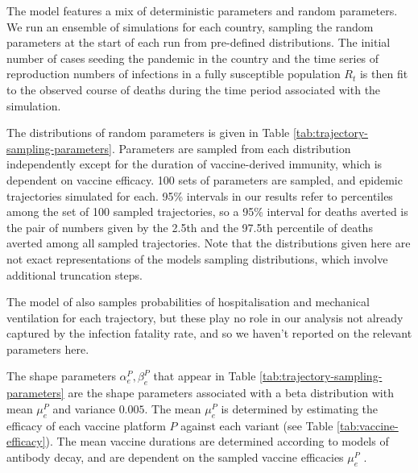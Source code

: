 \documentclass{article}
\begin{document}
The model features a mix of deterministic parameters and random parameters. We run an ensemble of simulations for each country, sampling the random parameters at the start of each run from pre-defined distributions. The initial number of cases seeding the pandemic in the country and the time series of reproduction numbers of infections in a fully susceptible population \(R_t\) is then fit to the observed course of deaths during the time period associated with the simulation.

The distributions of random parameters is given in Table \ref{tab:trajectory-sampling-parameters}. Parameters are sampled from each distribution independently except for the duration of vaccine-derived immunity, which is dependent on vaccine efficacy. 100 sets of parameters are sampled, and epidemic trajectories simulated for each. 95\% intervals in our results refer to percentiles among the set of 100 sampled trajectories, so a 95\% interval for deaths averted is the pair of numbers given by the 2.5th and the 97.5th percentile of deaths averted among all sampled trajectories. Note that the distributions given here are not exact representations of the models sampling distributions, which involve additional truncation steps.

The model of \citep{watsonoliverj.COVID19LMICReports2022} also samples probabilities of hospitalisation and mechanical ventilation for each trajectory, but these play no role in our analysis not already captured by the infection fatality rate, and so we haven't reported on the relevant parameters here.

The shape parameters \(\alpha_e^P, \beta_e^P\) that appear in Table \ref{tab:trajectory-sampling-parameters} are the shape parameters associated with a beta distribution with mean \(\mu_e^P\) and variance \(0.005\). The mean \(\mu_e^P\) is determined by estimating the efficacy of each vaccine platform \(P\) against each variant (see Table \ref{tab:vaccine-efficacy}). The mean vaccine durations are determined according to models of antibody decay, and are dependent on the sampled vaccine efficacies \(\mu_e^P\) \citep{watsonoliverj.COVID19LMICReports2022}.
\end{document}
